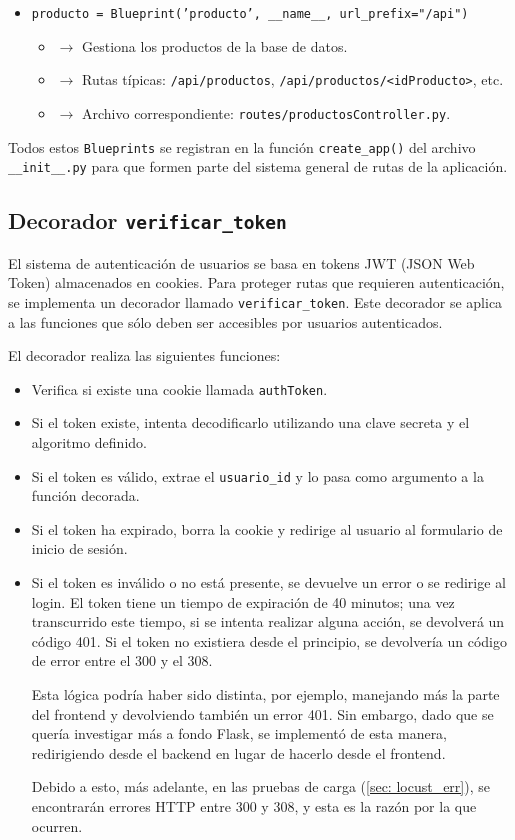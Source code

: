\documentclass[10pt]{book}
\begin{document}
\begin{itemize}
    \item \texttt{producto = Blueprint('producto', \_\_name\_\_, url\_prefix="/api")}
    \begin{itemize}
        \item $\rightarrow$ Gestiona los productos de la base de datos.
        \item $\rightarrow$ Rutas típicas: \texttt{/api/productos}, \texttt{/api/productos/<idProducto>}, etc.
        \item $\rightarrow$ Archivo correspondiente: \texttt{routes/productosController.py}.
    \end{itemize}
\end{itemize}

Todos estos \texttt{Blueprints} se registran en la función \texttt{create\_app()} del archivo \texttt{\_\_init\_\_.py} para que formen parte del sistema general de rutas de la aplicación.

\subsection{Decorador \texttt{verificar\_token}} \label{sec:token}

El sistema de autenticación de usuarios se basa en tokens JWT (JSON Web Token) almacenados en cookies. Para proteger rutas que requieren autenticación, se implementa un decorador llamado \texttt{verificar\_token}. Este decorador se aplica a las funciones que sólo deben ser accesibles por usuarios autenticados.

El decorador realiza las siguientes funciones:

\begin{itemize}
    \item Verifica si existe una cookie llamada \texttt{authToken}.
    \item Si el token existe, intenta decodificarlo utilizando una clave secreta y el algoritmo definido.
    \item Si el token es válido, extrae el \texttt{usuario\_id} y lo pasa como argumento a la función decorada.
    \item Si el token ha expirado, borra la cookie y redirige al usuario al formulario de inicio de sesión.
    \item Si el token es inválido o no está presente, se devuelve un error o se redirige al login. El token tiene un tiempo de expiración de 40 minutos; una vez transcurrido este tiempo, si se intenta realizar alguna acción, se devolverá un código 401. Si el token no existiera desde el principio, se devolvería un código de error entre el 300 y el 308. 
    
    Esta lógica podría haber sido distinta, por ejemplo, manejando más la parte del frontend y devolviendo también un error 401. Sin embargo, dado que se quería investigar más a fondo Flask, se implementó de esta manera, redirigiendo desde el backend en lugar de hacerlo desde el frontend. 
    
    Debido a esto, más adelante, en las pruebas de carga (\autoref{sec: locust_err}), se encontrarán errores HTTP entre 300 y 308, y esta es la razón por la que ocurren.
    
\end{itemize}
\end{document}
